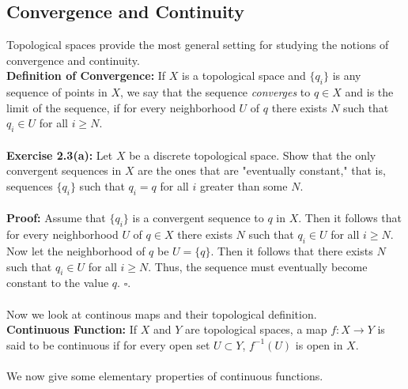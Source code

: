 \documentclass{article}
\begin{document}
 \subsection{Convergence and Continuity}
 Topological spaces provide the most general setting for studying the notions of convergence and continuity.\\
 \textbf{Definition of Convergence:} If $X$ is a topological space and $\{q_i\}$ is any sequence of points in $X$, we say that the sequence \textit{converges} to $q\in X$ and is the limit of the sequence, if for every neighborhood $U$ of $q$ there exists $N$ such that $q_i\in U$ for all $i\geq N$.\\
 \\
 \textbf{Exercise 2.3(a): }Let $X$ be a discrete topological space. Show that the only convergent sequences in $X$ are the ones that are "eventually constant," that is, sequences $\{q_i\}$ such that $q_i=q$ for all $i$ greater than some $N$.\\
 \\
 \textbf{Proof: } Assume that $\{q_i\}$ is a convergent sequence to $q$ in $X$. Then it follows that for every neighborhood $U$ of $q\in X$ there exists $N$ such that $q_i\in U$ for all $i\geq N$. Now let the neighborhood of $q$ be $U=\{q\}$. Then it follows that there exists $N$ such that $q_i\in U$ for all $i\geq N$. Thus, the sequence must eventually become constant to the value $q$. $\square$.\\
 \\
 Now we look at continous maps and their topological definition.\\
 \textbf{Continuous Function:} If $X$ and $Y$ are topological spaces, a map $f:X\to Y$ is said to be continuous if for every open set $U\subset Y$, $f^{-1}(U)$ is open in $X$.\\
 \\
 We now give some elementary properties of continuous functions.\\
\end{document}
